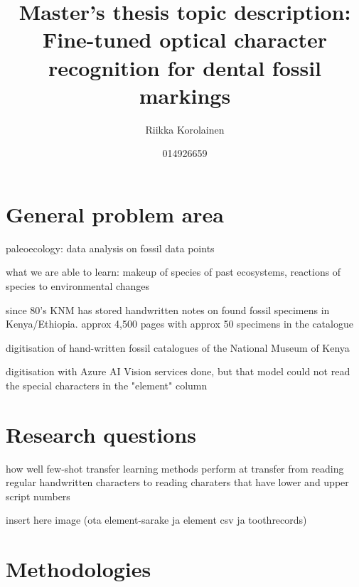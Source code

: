 \documentclass{article}
\title{Master's thesis topic description: Fine-tuned optical character recognition for dental fossil markings}
\author{Riikka Korolainen}
\date{014926659}
\begin{document}
\maketitle

\section{General problem area}

paleoecology: data analysis on fossil data points

what we are able to learn: makeup of species of past ecosystems, reactions
of species to environmental changes

since 80's KNM has stored handwritten notes on found fossil specimens in 
Kenya/Ethiopia. approx 4,500 pages with approx 50 specimens in the catalogue

digitisation of hand-written fossil catalogues of the National Museum of Kenya

digitisation with Azure AI Vision services done, but that model could 
not read the special characters in the "element" column


\section{Research questions}

how well few-shot transfer learning methods perform at transfer from reading 
regular handwritten characters to reading charaters that have lower and 
upper script numbers

insert here image (ota element-sarake ja element csv ja toothrecords)


\section{Methodologies}



\end{document}
